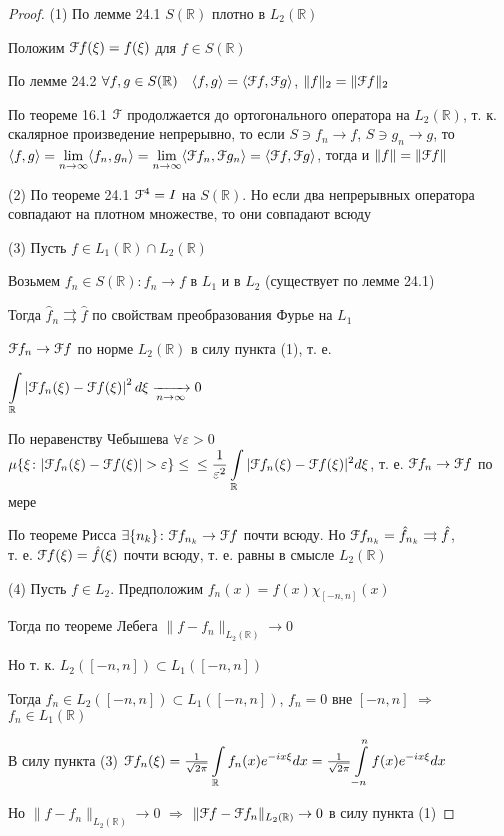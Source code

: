 \documentclass[a4paper,12pt]{report}
\begin{document}
\begin{proof}
(1) По лемме 24.1 $S(\mathbb R)$ плотно в $L_2(\mathbb R)$

Положим $\EuScript Ff(\xi)=f(\xi)$ для $f\in S(\mathbb R)$

По лемме 24.2 $\forall f,g\in S(\mathbb R)\quad\langle f,g\rangle=\langle\EuScript Ff,\EuScript Fg\rangle$, $\|f\|_2=\|\EuScript Ff\|_2$

По теореме 16.1 $\EuScript F$ продолжается до ортогонального оператора на $L_2(\mathbb R)$, т. к. скалярное произведение непрерывно, то если $S\ni f_n\to f$, $S\ni g_n\to g$, то $\langle f,g\rangle=\lim\limits_{n\to\infty}\langle f_n,g_n\rangle=\lim\limits_{n\to\infty}\langle\EuScript F f_n,\EuScript F g_n\rangle=\langle \EuScript Ff,\EuScript Fg\rangle$, тогда и $\|f\|=\|\EuScript Ff\|$

(2) По теореме 24.1 $\EuScript F^4=I$ на $S(\mathbb R)$. Но если два непрерывных оператора совпадают на плотном множестве, то они совпадают всюду

(3) Пусть $f\in L_1(\mathbb R)\cap L_2(\mathbb R)$

Возьмем $f_n\in S(\mathbb R)\colon f_n\to f$ в $L_1$ и в $L_2$ (существует по лемме 24.1)

Тогда $\hat f_n\rightrightarrows\hat f$ по свойствам преобразования Фурье на $L_1$

$\EuScript F f_n\to\EuScript Ff$ по норме $L_2(\mathbb R)$ в силу пункта (1), т. е. 

$\displaystyle\int\limits_{\mathbb R}\left|\EuScript F f_n(\xi)-\EuScript F f(\xi)\right|^2d\xi\xrightarrow[n\to\infty]{}0$

По неравенству Чебышева $\forall\varepsilon>0$ $\mu\{\xi\colon|\EuScript F f_n(\xi)-\EuScript F f(\xi)|>\varepsilon\}\le\\\le\displaystyle\frac1{\varepsilon^2}\displaystyle\int\limits_{\mathbb R}|\EuScript F f_n(\xi)-\EuScript F f(\xi)|^2d\xi$, т. е. $\EuScript F f_n\to\EuScript F f$ по мере

По теореме Рисса $\exists\{n_k\}\colon\EuScript F f_{n_k}\to\EuScript F f$ почти всюду. Но $\EuScript F f_{n_k}=\hat f_{n_k}\rightrightarrows\hat f$, \\т. е. $\EuScript F f(\xi)=\hat f(\xi)$ почти всюду, т. е. равны в смысле $L_2(\mathbb R)$

(4) Пусть $f\in L_2$. Предположим $f_n(x)=f(x)\chi_{[-n,n]}(x)$

Тогда по теореме Лебега $\|f-f_n\|_{L_2(\mathbb R)}\to0$

Но т. к. $L_2([-n,n])\subset L_1([-n,n])$

Тогда $f_n\in L_2([-n,n])\subset L_1([-n,n])$, $f_n=0$ вне $[-n,n]$ $\Rightarrow$ $f_n\in L_1(\mathbb R)$

В силу пункта (3) $\EuScript Ff_n(\xi)=\frac1{\sqrt{2\pi}}\displaystyle\int\limits_{\mathbb R}f_n(x)e^{-ix\xi}dx=\textstyle\frac1{\sqrt{2\pi}}\displaystyle\int\limits_{-n}^nf(x)e^{-ix\xi}dx$

Но $\|f-f_n\|_{L_2(\mathbb R)}\to0$ $\Rightarrow$ $\|\EuScript Ff-\EuScript F f_n\|_{L_2(\mathbb R)}\to0$ в силу пункта (1)
\end{proof}
\end{document}
